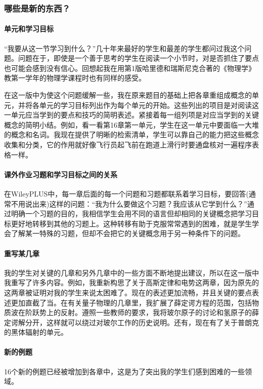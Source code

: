 \subsubsection*{哪些是新的东西？}
\paragraph{单元和学习目标}“我要从这一节学习到什么？”几十年来最好的学生和最差的学生都问过我这个问题。问题在于，即使是一个善于思考的学生在阅读一个小节时，对是否抓住了要点也可能会感到没有信心。回想起我在用第1版哈里德和瑞斯尼克合著的《物理学》教第一学年的物理学课程时也有同样的感受。

在这一版中为使这个问题缓解一些，我在原来题目的基础上把各章重组成概念的单元，并将各单元的学习目标列出作为每个单元的开始。这些列出的项目是对阅读这一单元应当学到的要点和技巧的简明表述。紧接着每一组列项是对应当学到的关键概念的简明小结。例如，看一看第16章第一单元，学生在这一单元中要面临一大堆的概念和名词。我现在提供了明晰的检索清单，学生可以靠自己的能力把这些概念收集和分类，它的作用就好像飞行员起飞前在跑道上滑行时要通盘核对一遍程序表格一样。

\paragraph{课外作业习题和学习目标之间的关系}
在WileyPLUS中，每一章后面的每一个问题和习题都联系着学习目标，要回答(通常不用说出来)这样的问题：“我为什么要做这个习题？我应该从它学到什么？”通过明确一个习题的目的，我相信学生会用不同的语言但却相同的关键概念把学习目标更好地转移到其他的习题上。这种转移有助于克服常常遇到的困难，就是学生学会了解某一特殊的习题，但却不会把它的关键概念用于另一种条件下的问题。

\paragraph{重写某几章}我的学生对关键的几章和另外几章中的一些方面不断地提出建议，所以在这一版中我重写了许多内容。例如，我重新构思了关于高斯定律和电势这两章，因为原先的这两章被证明对我的学生来说太困难了。现在的表述更加流畅，并且关键的要点表述更加直截了当。在有关量子物理的几章里，我扩展了薛定谔方程的范围，包括物质波在阶跃势上的反射。遵照一些教师的要求，我将玻尔原子的讨论和氢原子的薛定谔解分开，这样就可以绕过对玻尔工作的历史说明。还有，现在有了关于普朗克的黑体辐射的单元。

\paragraph{新的例题}16个新的例题已经被增加到各章中，这是为了突出我的学生们感到困难的一些领域。

